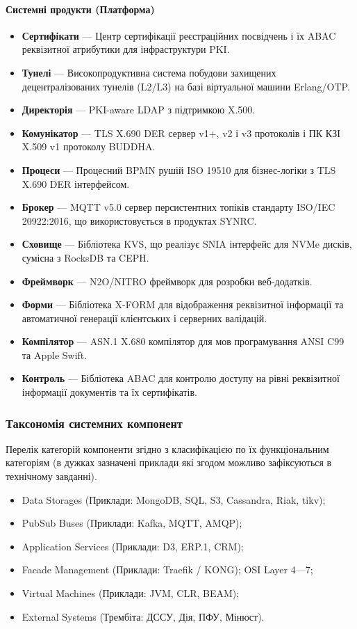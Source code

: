 \documentclass{article}
\begin{document}
\paragraph{Системні продукти (Платформа)}
\begin{itemize}
    \item \textbf{Сертифікати} --- Центр сертифікації реєстраційних посвідчень і їх ABAC реквізитної атрибутики для інфраструктури PKI.
    \item \textbf{Тунелі} --- Високопродуктивна система побудови захищених децентралізованих тунелів (L2/L3) на базі віртуальної машини Erlang/OTP.
    \item \textbf{Директорія} --- PKI-aware LDAP з підтримкою X.500.
    \item \textbf{Комунікатор} --- TLS X.690 DER сервер v1+, v2 і v3 протоколів і ПК КЗІ X.509 v1 протоколу BUDDHA.
    \item \textbf{Процеси} --- Процесний BPMN рушій ISO 19510 для бізнес-логіки з TLS X.690 DER інтерфейсом.
    \item \textbf{Брокер} --- MQTT v5.0 сервер персистентних топіків стандарту ISO/IEC 20922:2016, що використовується в продуктах SYNRC.
    \item \textbf{Сховище} --- Бібліотека KVS, що реалізує SNIA інтерфейс для NVMe дисків, сумісна з RocksDB та CEPH.
    \item \textbf{Фреймворк} --- N2O/NITRO фреймворк для розробки веб-додатків.
    \item \textbf{Форми} --- Бібліотека X-FORM для відображення реквізитної інформації та автоматичної генерації клієнтських і серверних валідацій.
    \item \textbf{Компілятор} --- ASN.1 X.680 компілятор для мов програмування ANSI C99 та Apple Swift.
    \item \textbf{Контроль} --- Бібліотека ABAC для контролю доступу на рівні реквізитної інформації документів та їх сертифікатів.
\end{itemize}

\newpage
\subsubsection{Таксономія системних компонент}

Перелік категорій компоненти згідно з класифікацією по їх функціональним категоріям (в дужках зазначені
приклади які згодом можливо зафіксуються в технічному завданні).

\begin{itemize}
  \item Data Storages (Приклади: MongoDB, SQL, S3, Cassandra, Riak, tikv);
  \item PubSub Buses (Приклади: Kafka, MQTT, AMQP);
  \item Application Services (Приклади: D3, ERP.1, CRM);
  \item Facade Management (Приклади: Traefik / KONG); OSI Layer 4—7;
  \item Virtual Machines (Приклади: JVM, CLR, BEAM);
  \item External Systems (Трембіта: ДССУ, Дія, ПФУ, Мінюст).
\end{itemize}
\end{document}

